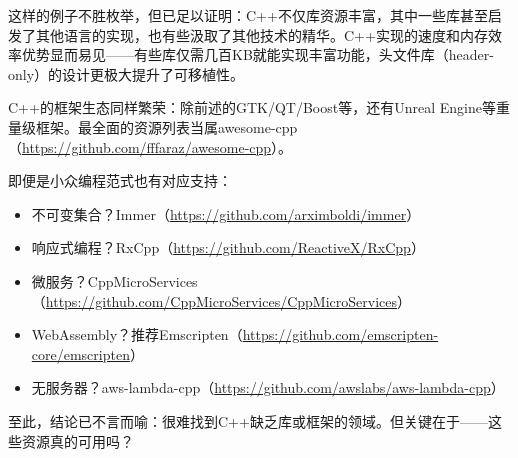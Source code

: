 这样的例子不胜枚举，但已足以证明：C++不仅库资源丰富，其中一些库甚至启发了其他语言的实现，也有些汲取了其他技术的精华。C++实现的速度和内存效率优势显而易见——有些库仅需几百KB就能实现丰富功能，头文件库（header-only）的设计更极大提升了可移植性。

C++的框架生态同样繁荣：除前述的GTK/QT/Boost等，还有Unreal Engine等重量级框架。最全面的资源列表当属awesome-cpp（\url{https://github.com/fffaraz/awesome-cpp}）。

即便是小众编程范式也有对应支持：

\begin{itemize}
\item 
不可变集合？Immer（\url{https://github.com/arximboldi/immer}）

\item 
响应式编程？RxCpp（\url{https://github.com/ReactiveX/RxCpp}）

\item 
微服务？CppMicroServices（\url{https://github.com/CppMicroServices/CppMicroServices}）

\item 
WebAssembly？推荐Emscripten（\url{https://github.com/emscripten-core/emscripten}）

\item 
无服务器？aws-lambda-cpp（\url{https://github.com/awslabs/aws-lambda-cpp}）
\end{itemize}

至此，结论已不言而喻：很难找到C++缺乏库或框架的领域。但关键在于——这些资源真的可用吗？

















